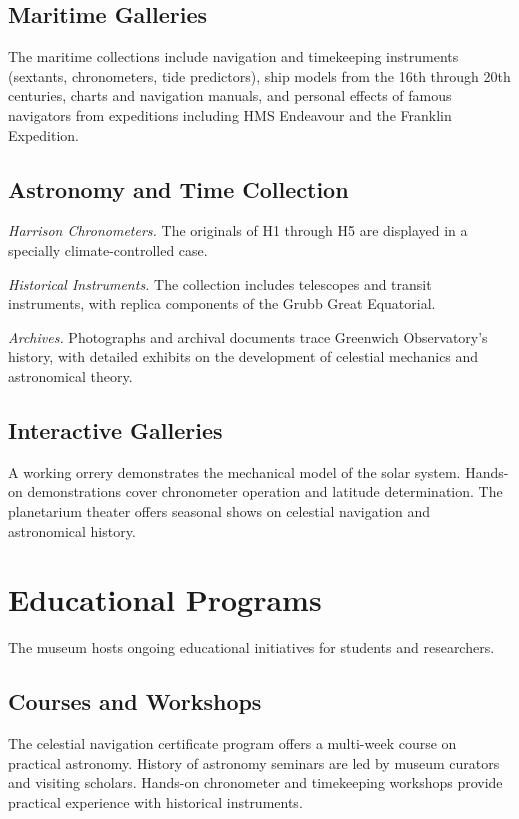 \subsection*{Maritime Galleries}

The maritime collections include navigation and timekeeping instruments (sextants, chronometers, tide predictors), ship models from the 16th through 20th centuries, charts and navigation manuals, and personal effects of famous navigators from expeditions including HMS Endeavour and the Franklin Expedition.

\subsection*{Astronomy and Time Collection}

\textit{Harrison Chronometers.} The originals of H1 through H5 are displayed in a specially climate-controlled case.

\textit{Historical Instruments.} The collection includes telescopes and transit instruments, with replica components of the Grubb Great Equatorial.

\textit{Archives.} Photographs and archival documents trace Greenwich Observatory's history, with detailed exhibits on the development of celestial mechanics and astronomical theory.

\subsection*{Interactive Galleries}

A working orrery demonstrates the mechanical model of the solar system. Hands-on demonstrations cover chronometer operation and latitude determination. The planetarium theater offers seasonal shows on celestial navigation and astronomical history.

\section{Educational Programs}

The museum hosts ongoing educational initiatives for students and researchers.

\subsection*{Courses and Workshops}

The celestial navigation certificate program offers a multi-week course on practical astronomy. History of astronomy seminars are led by museum curators and visiting scholars. Hands-on chronometer and timekeeping workshops provide practical experience with historical instruments.

